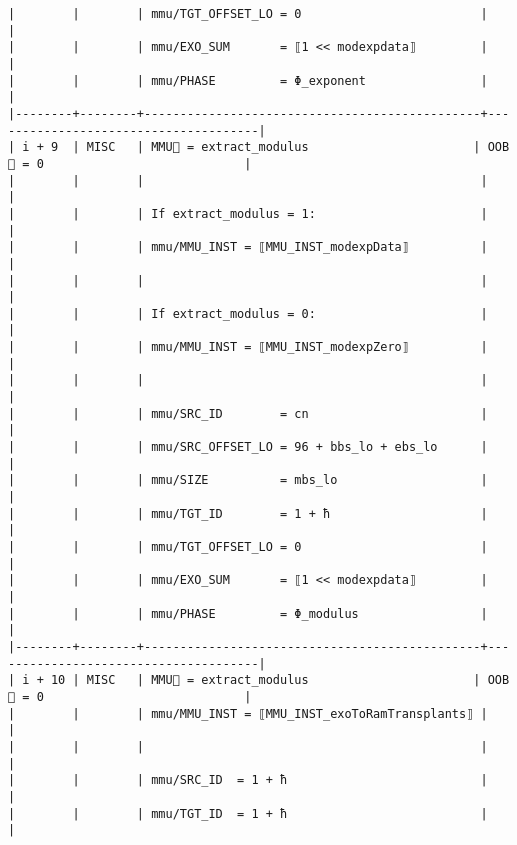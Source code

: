 \documentclass[varwidth=\maxdimen,margin=0.5cm,multi={verbatim}]{standalone}
\begin{document}
\begin{verbatim}
|        |        | mmu/TGT_OFFSET_LO = 0                         |                                      |
|        |        | mmu/EXO_SUM       = ⟦1 << modexpdata⟧         |                                      |
|        |        | mmu/PHASE         = Φ_exponent                |                                      |
|--------+--------+-----------------------------------------------+--------------------------------------|
| i + 9  | MISC   | MMU🏴 = extract_modulus                       | OOB🏴 = 0                            |
|        |        |                                               |                                      |
|        |        | If extract_modulus = 1:                       |                                      |
|        |        | mmu/MMU_INST = ⟦MMU_INST_modexpData⟧          |                                      |
|        |        |                                               |                                      |
|        |        | If extract_modulus = 0:                       |                                      |
|        |        | mmu/MMU_INST = ⟦MMU_INST_modexpZero⟧          |                                      |
|        |        |                                               |                                      |
|        |        | mmu/SRC_ID        = cn                        |                                      |
|        |        | mmu/SRC_OFFSET_LO = 96 + bbs_lo + ebs_lo      |                                      |
|        |        | mmu/SIZE          = mbs_lo                    |                                      |
|        |        | mmu/TGT_ID        = 1 + ħ                     |                                      |
|        |        | mmu/TGT_OFFSET_LO = 0                         |                                      |
|        |        | mmu/EXO_SUM       = ⟦1 << modexpdata⟧         |                                      |
|        |        | mmu/PHASE         = Φ_modulus                 |                                      |
|--------+--------+-----------------------------------------------+--------------------------------------|
| i + 10 | MISC   | MMU🏴 = extract_modulus                       | OOB🏴 = 0                            |
|        |        | mmu/MMU_INST = ⟦MMU_INST_exoToRamTransplants⟧ |                                      |
|        |        |                                               |                                      |
|        |        | mmu/SRC_ID  = 1 + ħ                           |                                      |
|        |        | mmu/TGT_ID  = 1 + ħ                           |                                      |

\end{verbatim}
\end{document}
